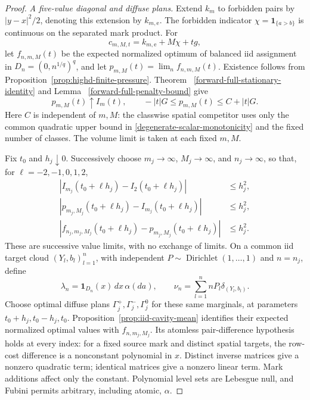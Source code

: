\documentclass[11pt,reqno]{amsart}
\theoremstyle{definition}
\theoremstyle{remark}
\numberwithin{equation}{section}
\begin{document}
\begin{proof}
\emph{A five-value diagonal and diffuse plans.}
Extend \(k_m\) to forbidden pairs by \(|y-x|^2/2\), denoting this
extension by \(k_{m,\mathrm e}\). The forbidden indicator
\(\chi=\mathbf1_{\{a>b\}}\) is continuous on the separated mark
product. For
\[
                  c_{m,M,t}=k_{m,\mathrm e}+M\chi+tg,
\]
let \(f_{n,m,M}(t)\) be the expected normalized optimum of balanced
iid assignment in \(D_n=(0,n^{1/q})^q\), and let
\(p_{m,M}(t)=\lim_n f_{n,m,M}(t)\). Existence follows from
Proposition~\ref{prop:highd-finite-pressure}. Theorem~
\ref{forward-full-stationary-identity} and Lemma~
\ref{forward-full-penalty-bound} give
\begin{equation}
\label{degenerate-scalar-penalty-limit}
 p_{m,M}(t)\uparrow I_m(t),\qquad
 -|t|G\le p_{m,M}(t)\le C+|t|G.
\end{equation}
Here \(C\) is independent of \(m,M\): the classwise spatial
competitor uses only the common quadratic upper bound in
\eqref{degenerate-scalar-monotonicity} and the fixed number of classes.
The volume limit is taken at each fixed \(m,M\).

Fix \(t_0\) and \(h_j\downarrow0\). Successively choose
\(m_j\to\infty\), \(M_j\to\infty\), and \(n_j\to\infty\), so
that, for \(\ell=-2,-1,0,1,2\),
\begin{equation}
\label{degenerate-scalar-five-values}
 \begin{split}
 |I_{m_j}(t_0+\ell h_j)-I_2(t_0+\ell h_j)|&\le h_j^2,\\
 |p_{m_j,M_j}(t_0+\ell h_j)-I_{m_j}(t_0+\ell h_j)|&\le h_j^2,\\
 |f_{n_j,m_j,M_j}(t_0+\ell h_j)-p_{m_j,M_j}(t_0+\ell h_j)|
    &\le h_j^2.
 \end{split}
\end{equation}
These are successive value limits, with no exchange of limits.
On a common iid target cloud \((Y_l,b_l)_{l=1}^n\), with
independent \(P\sim\operatorname{Dirichlet}(1,\ldots,1)\) and
\(n=n_j\), define
\[
 \lambda_n=\mathbf1_{D_n}(x)\,dx\,\alpha(da),\qquad
 \nu_n=\sum_{l=1}^n nP_l\delta_{(Y_l,b_l)}.
\]
Choose optimal diffuse plans \(\Gamma_j^+,\Gamma_j^-,\Gamma_j^0\)
for these same marginals, at parameters \(t_0+h_j,t_0-h_j,t_0\).
Proposition~\ref{prop:iid-cavity-mean} identifies their expected
normalized optimal values with \(f_{n,m_j,M_j}\). Its atomless
pair-difference hypothesis holds at every index: for a fixed source
mark and distinct spatial targets, the row-cost difference is a
nonconstant polynomial in \(x\). Distinct inverse matrices give a
nonzero quadratic term; identical matrices give a nonzero linear term.
Mark additions affect only the constant. Polynomial level sets are
Lebesgue null, and Fubini permits arbitrary, including atomic, \(\alpha\).


\end{proof}
\end{document}
